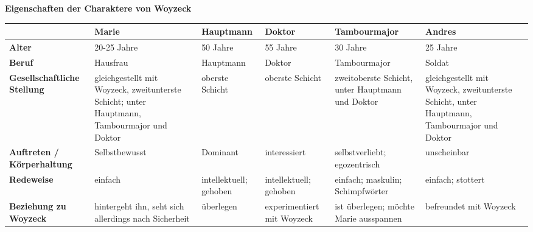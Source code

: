 \documentclass[12pt, a4paper]{report}
\begin{document}
	\newcommand{\elabo}[0]{\texttt{elaboriert}}
	\newcommand{\restr}[0]{\texttt{restringiert}}
	
	\noindent
	\Large \textbf{Eigenschaften der Charaktere von \dq Woyzeck\dq} \\[1cm]
	\normalsize
	\begin{tabularx}{\textwidth}{|X|X|X|X|X|X|}
		\hline
		 & \textbf{Marie} & \textbf{Hauptmann} & \textbf{Doktor} & \textbf{Tambourmajor} & \textbf{Andres} \\
		\hline
		\textbf{Alter} & 20-25 Jahre & 50 Jahre & 55 Jahre & 30 Jahre & 25 Jahre \\
		\hline
		\textbf{Beruf} & Hausfrau & Hauptmann & Doktor & Tambourmajor & Soldat \\
		\hline
		\textbf{Gesellschaftliche Stellung} & gleichgestellt mit Woyzeck, zweitunterste Schicht; unter Hauptmann, Tambourmajor und Doktor & oberste Schicht & oberste Schicht & zweitoberste Schicht, unter Hauptmann und Doktor & gleichgestellt mit Woyzeck, zweitunterste Schicht, unter Hauptmann, Tambourmajor und Doktor \\
		\hline
		\textbf{Auftreten / Körperhaltung} &Selbstbewusst& Dominant&interessiert&selbstverliebt; egozentrisch & unscheinbar \\
		\hline
		\textbf{Redeweise} &einfach& intellektuell; gehoben&intellektuell; gehoben&einfach; maskulin; Schimpfwörter& einfach; stottert \\
		\hline
		\textbf{Beziehung zu Woyzeck} &hintergeht ihn, seht sich allerdings nach Sicherheit & überlegen & experimentiert mit Woyzeck &ist überlegen; möchte Marie \dq ausspannen\dq & befreundet mit Woyzeck \\
		\hline
		
	\end{tabularx}
\end{document}
